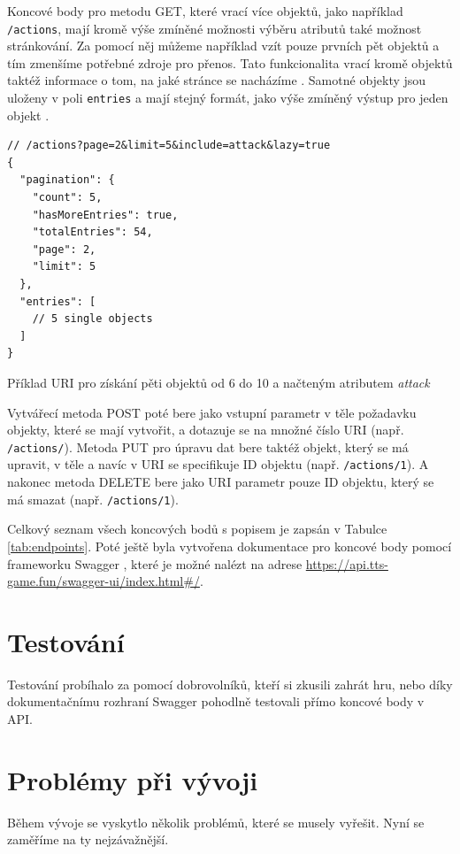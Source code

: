 Koncové body pro metodu GET, které vrací více objektů, jako například \texttt{/actions}, mají kromě výše zmíněné možnosti výběru atributů také možnost stránkování. Za pomocí něj můžeme například vzít pouze prvních pět objektů a tím zmenšíme potřebné zdroje pro přenos. Tato funkcionalita vrací kromě objektů taktéž informace o tom, na jaké stránce se nacházíme . Samotné objekty jsou uloženy v poli \texttt{entries} a mají stejný formát, jako výše zmíněný výstup pro jeden objekt .

\begin{listing}[H]
    \begin{verbatim}
// /actions?page=2&limit=5&include=attack&lazy=true
{
  "pagination": {
    "count": 5,
    "hasMoreEntries": true,
    "totalEntries": 54,
    "page": 2,
    "limit": 5
  },
  "entries": [ 
    // 5 single objects
  ]
}
    \end{verbatim}
    \caption{Příklad URI pro získání pěti objektů od 6 do 10 a načteným atributem \textit{attack}}
    \label{code:action:endpoint:multiple}
\end{listing}

Vytvářecí metoda POST poté bere jako vstupní parametr v těle požadavku objekty, které se mají vytvořit, a dotazuje se na množné číslo URI (např. \texttt{/actions/}). Metoda PUT pro úpravu dat bere taktéž objekt, který se má upravit, v těle a navíc v URI se specifikuje ID objektu (např. \texttt{/actions/1}). A nakonec metoda DELETE bere jako URI parametr pouze ID objektu, který se má smazat (např. \texttt{/actions/1}).

Celkový seznam všech koncových bodů s popisem je zapsán v Tabulce \ref{tab:endpoints}. Poté ještě byla vytvořena dokumentace pro koncové body pomocí frameworku Swagger , které je možné nalézt na adrese \url{https://api.tts-game.fun/swagger-ui/index.html#/}.


\section{Testování}\label{sec:testing}
Testování probíhalo za pomocí dobrovolníků, kteří si zkusili zahrát hru, nebo díky dokumentačnímu rozhraní Swagger  pohodlně testovali přímo koncové body v API.



\section{Problémy při vývoji}\label{sec:impl:problems}
Během vývoje se vyskytlo několik problémů, které se musely vyřešit. Nyní se zaměříme na ty nejzávažnější.

